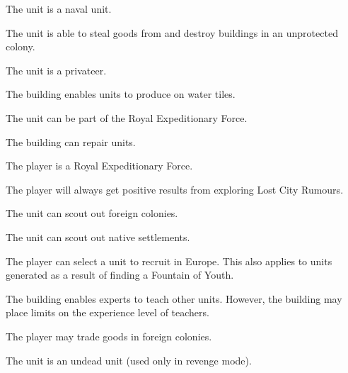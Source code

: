 \documentclass[12pt]{book}
\begin{document}
The unit is a naval unit.

\affectsUnit

The unit is able to steal goods from and destroy buildings in an
unprotected colony.

\affectsUnit

The unit is a privateer.

\affectsBuilding

The building enables units to produce on water tiles.

\affectsUnit

The unit can be part of the Royal Expeditionary Force.

\affectsBuilding

The building can repair units.

\affectsPlayer

The player is a Royal Expeditionary Force.

\affectsPlayer

The player will always get positive results from exploring Lost City
Rumours.

\affectsUnit

The unit can scout out foreign colonies.

\affectsUnit

The unit can scout out native settlements.

\affectsPlayer

The player can select a unit to recruit in Europe. This also applies
to units generated as a result of finding a Fountain of Youth.

\affectsBuilding

The building enables experts to teach other units. However, the
building may place limits on the experience level of teachers.

\affectsPlayer

The player may trade goods in foreign colonies.

\affectsUnit

The unit is an undead unit (used only in revenge mode).
\end{document}

